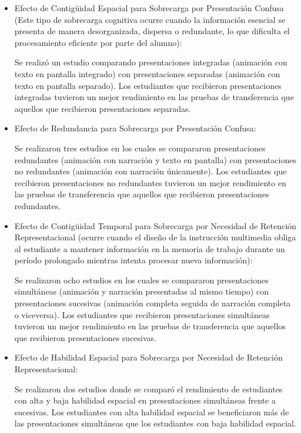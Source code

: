 \begin{itemize}
\begin{itemize}
\begin{itemize}
             \item Efecto de Contigüidad Espacial para Sobrecarga por Presentación Confusa (Este tipo de sobrecarga cognitiva ocurre cuando la información esencial se presenta de manera desorganizada, dispersa o redundante, lo que dificulta el procesamiento eficiente por parte del alumno):

             Se realizó un estudio comparando presentaciones integradas (animación con texto en pantalla integrado) con presentaciones separadas (animación con texto en pantalla separado). Los estudiantes que recibieron presentaciones integradas tuvieron un mejor rendimiento en las pruebas de transferencia que aquellos que recibieron presentaciones separadas.

             \item Efecto de Redundancia para Sobrecarga por Presentación Confusa: 

             Se realizaron tres estudios en los cuales se compararon presentaciones redundantes (animación con narración y texto en pantalla) con presentaciones no redundantes (animación con narración únicamente). Los estudiantes que recibieron presentaciones no redundantes tuvieron un mejor rendimiento en las pruebas de transferencia que aquellos que recibieron presentaciones redundantes.

             \item Efecto de Contigüidad Temporal para Sobrecarga por Necesidad de Retención Representacional (ocurre cuando el diseño de la instrucción multimedia obliga al estudiante a mantener información en la memoria de trabajo durante un período prolongado mientras intenta procesar nueva información):

             Se realizaron ocho estudios en los cuales se compararon presentaciones simultáneas (animación y narración presentadas al mismo tiempo) con presentaciones sucesivas (animación completa seguida de narración completa o viceversa). Los estudiantes que recibieron presentaciones simultáneas tuvieron un mejor rendimiento en las pruebas de transferencia que aquellos que recibieron presentaciones sucesivas.

             \item  Efecto de Habilidad Espacial para Sobrecarga por Necesidad de Retención Representacional:

             Se realizaron dos estudios donde se comparó el rendimiento de estudiantes con alta y baja habilidad espacial en presentaciones simultáneas frente a sucesivas. Los estudiantes con alta habilidad espacial se beneficiaron más de las presentaciones simultáneas que los estudiantes con baja habilidad espacial. 
        \end{itemize}
    \end{itemize}


\end{itemize}
